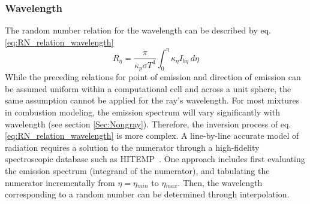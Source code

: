 \subsubsection{Wavelength}
The random number relation for the wavelength can be described by eq. \ref{eq:RN_relation_wavelength}
\begin{equation}
    R_\eta{}=\frac{\pi{}}{\kappa{}_p\sigma{}T^4}\int_0^\eta{}\kappa{}_\eta{}I_{b\eta{}}~d\eta{}
    \label{eq:RN_relation_wavelength}
\end{equation}
While the preceding relations for point of emission and direction of emission can be assumed uniform within a computational cell and across a unit sphere, the same assumption cannot be applied for the ray's wavelength. For most mixtures in combustion modeling, the emission spectrum will vary significantly with wavelength (see section \ref{Sec:Nongray}). 
Therefore, the inversion process of eq. \ref{eq:RN_relation_wavelength} is more complex.
A line-by-line accurate model of radiation requires a solution to the numerator through a high-fidelity spectroscopic database such as HITEMP~\cite{Rothman2010HITEMPDatabase}.
One approach includes first evaluating the emission spectrum (integrand of the numerator), and tabulating the numerator incrementally from $\eta{}=\eta{}_{min}$ to $\eta{}_{max}$.
Then, the wavelength corresponding to a random number can be determined through interpolation.

